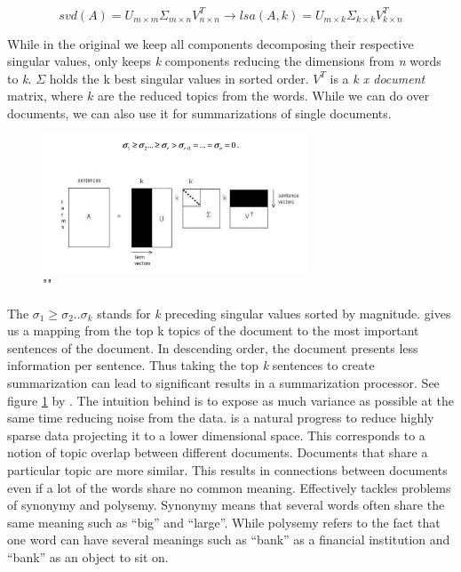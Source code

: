       \begin{equation}
        svd(A) = U_{m \times m}\Sigma_{m \times n} V^{T}_{n \times n} \to lsa(A, k) = U_{m \times k}\Sigma_{k \times k} V^{T}_{k \times n}
      \end{equation}

      While in the original \svd{} we keep all components decomposing their respective singular values, \lsa{} only keeps \emph{k} components reducing the dimensions from \emph{n} words to \emph{k}. $\Sigma$ holds the k best singular values in sorted order. $V^{T}$ is a \emph{k x document} matrix, where $k$ are the reduced topics from the words. While we can do \lsa{} over documents, we can also use it for summarizations of single documents.

      \begin{figure}[h!]
        \centering
          \includegraphics[width=0.7\textwidth]{svd_lsa.png}
          \caption{"\svdfull{}"}
          \label{svd_lsa}
      \end{figure}

      The $\sigma_1 \geq \sigma_2..\sigma_k$ stands for \emph{k} preceding singular values sorted by magnitude. \lsa{} gives us a mapping from the top k topics of the document to the most important sentences of the document. In descending order, the document presents less information per sentence. Thus taking the top \emph{k} sentences to create summarization can lead to significant results in a summarization processor. See figure \ref{svd_lsa} by \cite{SumLSASteinberger2004}.
      The intuition behind \svd{} is to expose as much variance as possible at the same time reducing noise from the data. \svd{} is a natural progress to reduce highly sparse data projecting it to a lower dimensional space. This corresponds to a notion of topic overlap between different documents.
      Documents that share a particular topic are more similar. This results in connections between documents even if a lot of the words share no common meaning. Effectively \lsa{} tackles problems of synonymy and polysemy. Synonymy means that several words often share the same meaning such as ``big'' and ``large''. While polysemy refers to the fact that one word can have several meanings such as ``bank'' as a financial institution and ``bank'' as an object to sit on.

